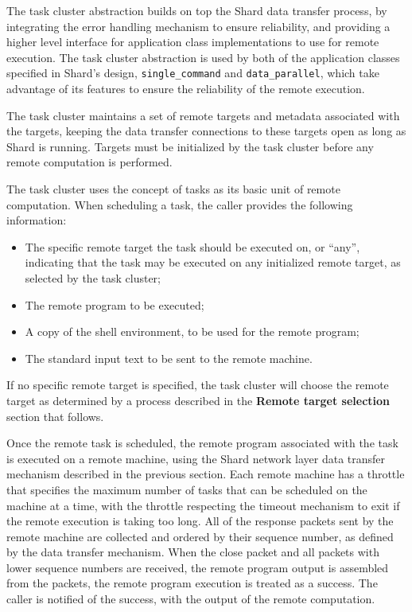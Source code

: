 \documentclass[twoside]{report}
\begin{document}
The task cluster abstraction builds on top the Shard data transfer process, by integrating the error handling mechanism to ensure reliability, and providing a higher level interface for application class implementations to use for remote execution.
The task cluster abstraction is used by both of the application classes specified in Shard's design, \texttt{single\_command} and \texttt{data\_parallel}, which take advantage of its features to ensure the reliability of the remote execution.

The task cluster maintains a set of remote targets and metadata associated with the targets, keeping the data transfer connections to these targets open as long as Shard is running.
Targets must be initialized by the task cluster before any remote computation is performed.

The task cluster uses the concept of tasks as its basic unit of remote computation.
When scheduling a task, the caller provides the following information:
\begin{itemize}
  \item The specific remote target the task should be executed on, or ``any'', indicating that the task may be executed on any initialized remote target, as selected by the task cluster;
  \item The remote program to be executed;
  \item A copy of the shell environment, to be used for the remote program;
  \item The standard input text to be sent to the remote machine.
\end{itemize}
If no specific remote target is specified, the task cluster will choose the remote target as determined by a process described in the \textbf{Remote target selection} section that follows.

Once the remote task is scheduled, the remote program associated with the task is executed on a remote machine, using the Shard network layer data transfer mechanism described in the previous section.
Each remote machine has a throttle that specifies the maximum number of tasks that can be scheduled on the machine at a time, with the throttle respecting the timeout mechanism to exit if the remote execution is taking too long.
All of the response packets sent by the remote machine are collected and ordered by their sequence number, as defined by the data transfer mechanism.
When the close packet and all packets with lower sequence numbers are received, the remote program output is assembled from the packets, the remote program execution is treated as a success.
The caller is notified of the success, with the output of the remote computation.
\end{document}
